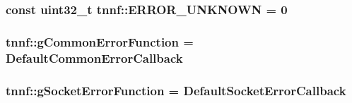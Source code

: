 \subsubsection[{E\+R\+R\+O\+R\+\_\+\+U\+N\+K\+N\+O\+W\+N}]{\setlength{\rightskip}{0pt plus 5cm}const uint32\+\_\+t tnnf\+::\+E\+R\+R\+O\+R\+\_\+\+U\+N\+K\+N\+O\+W\+N = 0}\label{namespacetnnf_a754e3b1ba0068cba6479b08b2ebec56c}
\hypertarget{namespacetnnf_a09f00feabd8f2363f85eaa64d9f0a1bb}{}
\subsubsection[{g\+Common\+Error\+Function}]{ tnnf\+::g\+Common\+Error\+Function = {\bf Default\+Common\+Error\+Callback}}\label{namespacetnnf_a09f00feabd8f2363f85eaa64d9f0a1bb}
\hypertarget{namespacetnnf_a802200ba988ad42ccc91044d5f95d24e}{}
\subsubsection[{g\+Socket\+Error\+Function}]{ tnnf\+::g\+Socket\+Error\+Function = {\bf Default\+Socket\+Error\+Callback}}\label{namespacetnnf_a802200ba988ad42ccc91044d5f95d24e}
